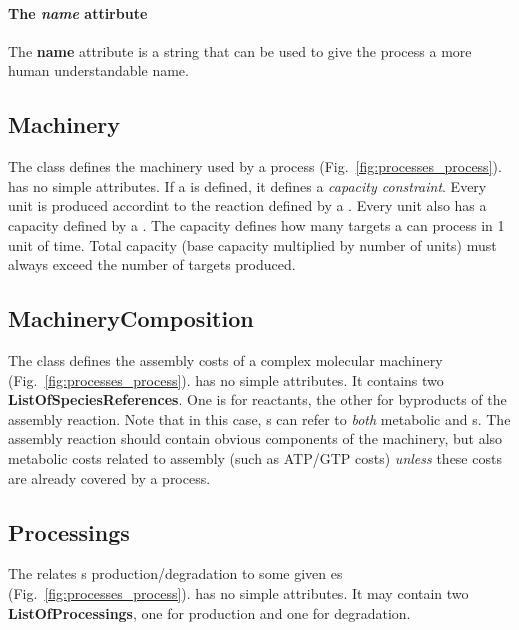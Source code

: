 \paragraph{The \textit{name} attirbute}
The \textbf{name} attribute is a string that can be used to give the process
a more human understandable name.


\subsection{Machinery}
\label{sec:machinery}

The \machinery{} class defines the machinery used by a process
(Fig.~\ref{fig:processes_process}).
\machinery{} has no simple attributes.
If a \machinery{} is defined, it defines a \emph{capacity constraint}.
Every \machinery{} unit is produced accordint to the reaction
defined by a \machinerycomposition.
Every unit also has a capacity defined by a \targetvalue.
The capacity defines how many targets a \machinery{} can process in 1 unit of
time.
Total capacity (base capacity multiplied by number of \machinery{} units)
must always exceed the number of targets produced.


\subsection{MachineryComposition}
\label{sec:machinery_composition}

The \machinerycomposition{} class defines the assembly costs of a complex
molecular machinery (Fig.~\ref{fig:processes_process}).
\machinerycomposition{} has no simple attributes.
It contains two \textbf{ListOfSpeciesReferences}.
One is for reactants, the other for byproducts of the assembly reaction.
Note that in this case, \speciesreference{}s can refer to \emph{both}
metabolic \species{} and \macromolecule{}s.
The assembly reaction should contain obvious components of the machinery,
but also metabolic costs related to assembly (such as ATP/GTP costs)
\emph{unless} these costs are already covered by a process.


\subsection{Processings}
\label{sec:processings}

The \processings{} relates \macromolecule{}s production/degradation to
some given \process{}es (Fig.~\ref{fig:processes_process}).
\processings{} has no simple attributes.
It may contain two \textbf{ListOfProcessings}, one for production and one for
degradation.


